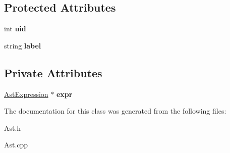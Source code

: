 \subsection*{Protected Attributes}
\begin{DoxyCompactItemize}
\item 
\hypertarget{classAST_a847b778f1c3dd5a19de32de432ee6e15}{int {\bfseries uid}}\label{classAST_a847b778f1c3dd5a19de32de432ee6e15}

\item 
\hypertarget{classAST_ab2e239ccc0688d2341724432ff5a1a31}{string {\bfseries label}}\label{classAST_ab2e239ccc0688d2341724432ff5a1a31}

\end{DoxyCompactItemize}
\subsection*{Private Attributes}
\begin{DoxyCompactItemize}
\item 
\hypertarget{classAstReturn_a77d7196bb413122310c56d8c97ef1823}{\hyperlink{classAstExpression}{Ast\-Expression} $\ast$ {\bfseries expr}}\label{classAstReturn_a77d7196bb413122310c56d8c97ef1823}

\end{DoxyCompactItemize}


The documentation for this class was generated from the following files\-:\begin{DoxyCompactItemize}
\item 
Ast.\-h\item 
Ast.\-cpp\end{DoxyCompactItemize}
